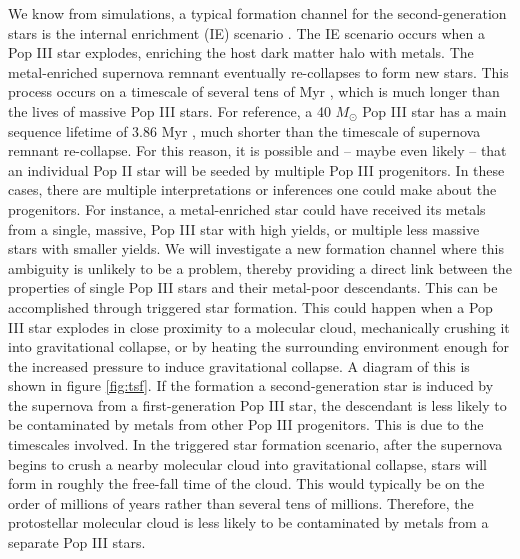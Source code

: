\documentclass[a4paper, 12pt]{article}
\begin{document}
We know from simulations, a typical formation channel for the second-generation stars is the internal enrichment (IE) scenario \citep{Chiaki2019}. The IE scenario occurs when a Pop III star explodes, enriching the host dark matter halo with metals. The metal-enriched supernova remnant eventually re-collapses to form new stars. This process occurs on a timescale of several tens of Myr \citep{Chiaki2019}, which is much longer than the lives of massive Pop III stars. For reference, a 40 $M_\odot$ Pop III star has a main sequence lifetime of 3.86 Myr \citep{Schaerer2002}, much shorter than the timescale of supernova remnant re-collapse. For this reason, it is possible and -- maybe even likely -- that an individual Pop II star will be seeded by multiple Pop III progenitors. In these cases, there are multiple interpretations or inferences one could make about the progenitors. For instance, a metal-enriched star could have received its metals from a single, massive, Pop III star with high yields, or multiple less massive stars with smaller yields. We will investigate a new formation channel where this ambiguity is unlikely to be a problem, thereby providing a direct link between the properties of single Pop III stars and their metal-poor descendants. This can be accomplished through triggered star formation. This could happen when a Pop III star explodes in close proximity to a molecular cloud, mechanically crushing it into gravitational collapse, or by heating the surrounding environment enough for the increased pressure to induce gravitational collapse. A diagram of this is shown in figure \ref{fig:tsf}. If the formation a second-generation star is induced by the supernova from a first-generation Pop III star, the descendant is less likely to be contaminated by metals from other Pop III progenitors. This is due to the timescales involved. In the triggered star formation scenario, after the supernova begins to crush a nearby molecular cloud into gravitational collapse, stars will form in roughly the free-fall time of the cloud. This would typically be on the order of millions of years rather than several tens of millions. Therefore, the protostellar molecular cloud is less likely to be contaminated by metals from a separate Pop III stars. 
\end{document}
